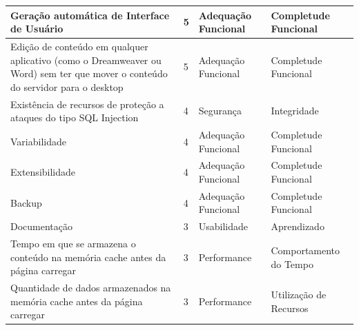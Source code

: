 \begin{apendicesenv}
\begin{longtable}{|p{175pt}|p{18pt}|p{110pt}|p{120pt}|}
{\raggedright {Geração automática de Interface de Usuário}}
  	 	 & {\raggedright {5}}
  	 	 & {\raggedright {Adequação Funcional}}
  	 	 & {\raggedright {Completude Funcional}}\\
  	 	\hline

{\raggedright {Edição de conteúdo em qualquer aplicativo (como o Dreamweaver ou Word) sem ter que mover o conteúdo do servidor para o desktop}}
  	 	 & {\raggedright {5}}
  	 	 & {\raggedright {Adequação Funcional}}
  	 	 & {\raggedright {Completude Funcional}}\\
  	 	\hline 
 {\raggedright {Existência de recursos de proteção a ataques do tipo SQL Injection}}
  	 	 & {\raggedright {4}}
  	 	 & {\raggedright {Segurança}}
  	 	 & {\raggedright {Integridade}}\\
  	 	\hline

{\raggedright {Variabilidade}}
  	 	 & {\raggedright {4}}
  	 	 & {\raggedright {Adequação Funcional}}
  	 	 & {\raggedright {Completude Funcional}}\\
  	 	\hline
{\raggedright {Extensibilidade}}
  	 	 & {\raggedright {4}}
  	 	 & {\raggedright {Adequação Funcional}}
  	 	 & {\raggedright {Completude Funcional}}\\
  	 	\hline
 
{\raggedright {Backup}}
  	 	 & {\raggedright {4}}
  	 	 & {\raggedright {Adequação Funcional}}
  	 	 & {\raggedright {Completude Funcional}}\\
  	 	\hline

{\raggedright {Documentação}}
  	 	 & {\raggedright {3}}
  	 	 & {\raggedright {Usabilidade}}
  	 	 & {\raggedright {Aprendizado}}\\
  	 	\hline


{\raggedright {Tempo em que se armazena o conteúdo na memória cache antes da página carregar}}
  	 	 & {\raggedright {3}}
  	 	 & {\raggedright {Performance}}
  	 	 & {\raggedright {Comportamento do Tempo}}\\
  	 	\hline
{\raggedright {Quantidade de dados armazenados na memória cache antes da página carregar}}
  	 	 & {\raggedright {3}}
  	 	 & {\raggedright {Performance}}
  	 	 & {\raggedright {Utilização de Recursos}}\\
  	 	\hline
 

\end{longtable}
\end{apendicesenv}
